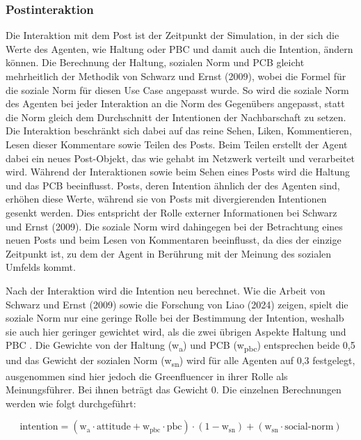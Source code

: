 \documentclass[runningheads]{llncs}
\begin{document}
\subsubsection{Postinteraktion} 
Die Interaktion mit dem Post ist der Zeitpunkt der Simulation, in der sich die Werte des Agenten, wie Haltung oder PBC und damit auch die Intention, ändern können. Die Berechnung der Haltung, sozialen Norm und PCB gleicht mehrheitlich der Methodik von Schwarz und Ernst (2009), wobei die Formel für die soziale Norm für diesen Use Case angepasst wurde. So wird die soziale Norm des Agenten bei jeder Interaktion an die Norm des Gegenübers angepasst, statt die Norm gleich dem Durchschnitt der Intentionen der Nachbarschaft zu setzen.
Die Interaktion beschränkt sich dabei auf das reine Sehen, Liken, Kommentieren, Lesen dieser Kommentare sowie Teilen des Posts. Beim Teilen erstellt der Agent dabei ein neues Post-Objekt, das wie gehabt im Netzwerk verteilt und verarbeitet wird. Während der Interaktionen sowie beim Sehen eines Posts wird die Haltung und das PCB beeinflusst. Posts, deren Intention ähnlich der des Agenten sind, erhöhen diese Werte, während sie von Posts mit divergierenden Intentionen gesenkt werden. Dies entspricht der Rolle externer Informationen bei Schwarz und Ernst (2009). Die soziale Norm wird dahingegen bei der Betrachtung eines neuen Posts und beim Lesen von Kommentaren beeinflusst, da dies der einzige Zeitpunkt ist, zu dem der Agent in Berührung mit der Meinung des sozialen Umfelds kommt. 


Nach der Interaktion wird die Intention neu berechnet. Wie die Arbeit von Schwarz und Ernst (2009) sowie die Forschung von Liao (2024) zeigen, spielt die soziale Norm nur eine geringe Rolle bei der Bestimmung der Intention, weshalb sie auch hier geringer gewichtet wird, als die zwei übrigen Aspekte Haltung und PBC \cite{schwarz_agent-based_2009,liao_exploring_2024}. Die Gewichte von der Haltung (w\textsubscript{a}) und PCB (w\textsubscript{pbc}) entsprechen beide 0,5 und das Gewicht der sozialen Norm (w\textsubscript{sn}) wird für alle Agenten auf 0,3 festgelegt, ausgenommen sind hier jedoch die Greenfluencer in ihrer Rolle als Meinungsführer. Bei ihnen beträgt das Gewicht 0. Die einzelnen Berechnungen werden wie folgt durchgeführt:

\begin{equation}
  \text{intention} = (\text{w}_{\text{a}} \cdot \text{attitude} + \text{w}_{\text{pbc}} \cdot \text{pbc}) \cdot (1 - \text{w}_{\text{sn}}) 
  + (\text{w}_{\text{sn}} \cdot \text{social-norm})
  \label{eq:intention}
\end{equation}
\end{document}
